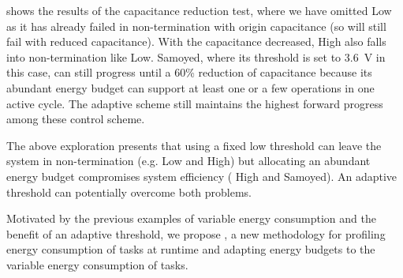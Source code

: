 

 shows the results of the capacitance reduction test, where we have omitted \debs{} Low as it has already failed in non-termination with origin capacitance (so will still fail with reduced capacitance). 
With the capacitance decreased, \debs{} High also falls into non-termination like \debs{} Low. 
Samoyed, where its threshold is set to \SI{3.6}{\volt} in this case, can still progress until a 60\% reduction of capacitance because its abundant energy budget can support at least one or a few operations in one active cycle.
The adaptive scheme still maintains the highest forward progress among these control scheme. 


The above exploration presents that using a fixed low threshold can leave the system in non-termination (e.g. \debs{} Low and \debs{} High) but allocating an abundant energy budget compromises system efficiency (\debs{} High and Samoyed). 
An adaptive threshold can potentially overcome both problems.

Motivated by the previous examples of variable energy consumption and the benefit of an adaptive threshold, we propose \nn{}, a new methodology for profiling energy consumption of tasks at runtime and adapting energy budgets to the variable energy consumption of tasks. 
